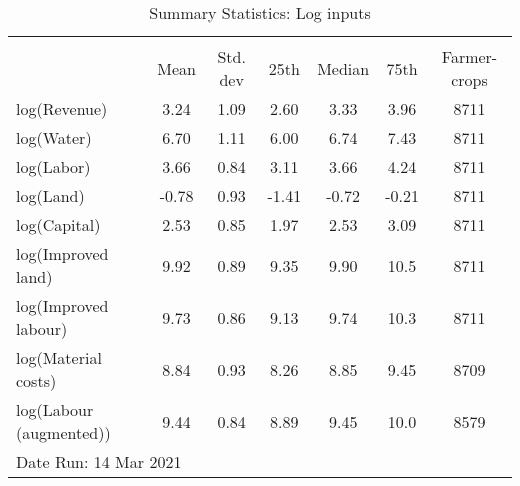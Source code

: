 \begin{table}[htbp]\centering
\def\sym#1{\ifmmode^{#1}\else\(^{#1}\)\fi}
\caption{Summary Statistics: Log inputs}
\begin{tabular*}{1.0\hsize}{@{\hskip\tabcolsep\extracolsep\fill}l*{1}{cccccc}}
\toprule
                                    &\multicolumn{6}{c}{}                                                         \\
                                    &        Mean&    Std. dev&        25th&      Median&        75th&Farmer-crops\\
\midrule
log(Revenue)                        &        3.24&        1.09&        2.60&        3.33&        3.96&        8711\\
log(Water)                          &        6.70&        1.11&        6.00&        6.74&        7.43&        8711\\
log(Labor)                          &        3.66&        0.84&        3.11&        3.66&        4.24&        8711\\
log(Land)                           &       -0.78&        0.93&       -1.41&       -0.72&       -0.21&        8711\\
log(Capital)                        &        2.53&        0.85&        1.97&        2.53&        3.09&        8711\\
log(Improved land)                  &        9.92&        0.89&        9.35&        9.90&        10.5&        8711\\
log(Improved labour)                &        9.73&        0.86&        9.13&        9.74&        10.3&        8711\\
log(Material costs)                 &        8.84&        0.93&        8.26&        8.85&        9.45&        8709\\
log(Labour (augmented))             &        9.44&        0.84&        8.89&        9.45&        10.0&        8579\\
\bottomrule
\multicolumn{7}{l}{\footnotesize Date Run: 14 Mar 2021}\\
\end{tabular*}
\end{table}
